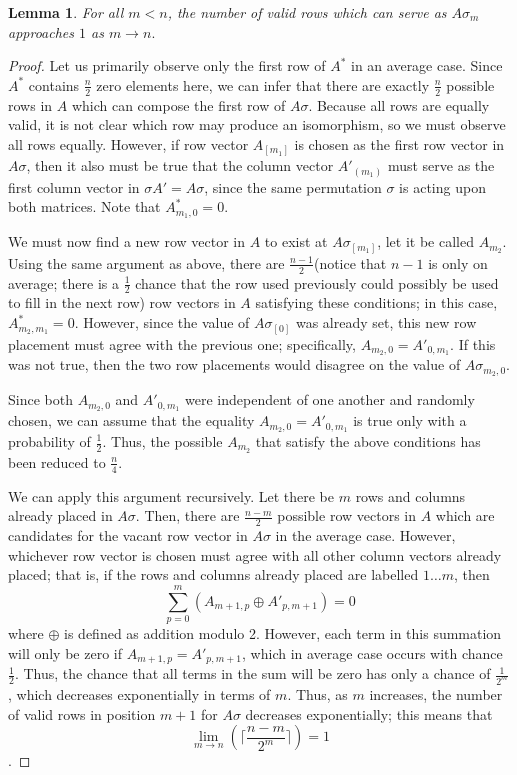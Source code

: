 \documentclass[12pt]{article}
\newtheorem{lemma}[theorem]{Lemma}
\begin{document}
\begin{lemma}
For all $m<n$, the number of valid rows which can serve as $A \sigma_{m}$ approaches $1$ as $m \to n.$
\end{lemma}
\begin{proof}
Let us primarily observe only the first row of $A^*$ in an average case. Since $A^*$ contains $\frac{n}{2}$ zero elements here, we can infer that there are exactly $\frac{n}{2}$ possible rows in $A$ which can compose the first row of $A \sigma$. Because all rows are equally valid, it is not clear which row may produce an isomorphism, so we must observe all rows equally. However, if row vector $A_{[m_1]}$ is chosen as the first row vector in $A \sigma$, then it also must be true that the column vector $A'_{(m_1)}$ must serve as the first column vector in $\sigma A' = A \sigma$, since the same permutation $\sigma$ is acting upon both matrices. Note that $A^*_{m_1, 0} = 0$.

We must now find a new row vector in $A$ to exist at $A \sigma_{[m_1]}$, let it be called $A_{m_2}$. Using the same argument as above, there are $\frac{n-1}{2}$(notice that $n-1$ is only on average; there is a $\frac{1}{2}$ chance that the row used previously could possibly be used to fill in the next row) row vectors in $A$ satisfying these conditions; in this case, $A^*_{m_2,m_1} = 0$. However, since the value of $A \sigma_{[0]}$ was already set, this new row placement must agree with the previous one; specifically, $A_{m_2, 0} = A'_{0, m_1}$. If this was not true, then the two row placements would disagree on the value of $A \sigma_{m_2, 0}$. 

Since both $A_{m_2, 0}$ and $A'_{0, m_1}$ were independent of one another and randomly chosen, we can assume that the equality $A_{m_2, 0} = A'_{0, m_1}$ is true only with a probability of $\frac{1}{2}$. Thus, the possible $A_{m_2}$ that satisfy the above conditions has been reduced to $\frac{n}{4}$.

We can apply this argument recursively. Let there be $m$ rows and columns already placed in $A \sigma$. Then, there are $\frac{n-m}{2}$ possible row vectors in $A$ which are candidates for the vacant row vector in $A \sigma$ in the average case. However, whichever row vector is chosen must agree with all other column vectors already placed; that is, if the rows and columns already placed are labelled $1 \dots m$, then $$\sum_{p=0}^{m} (A_{m+1, p} \oplus A'_{p,m+1}) = 0$$ where $\oplus$ is defined as addition modulo 2. However, each term in this summation will only be zero if $A_{m+1,p} = A'_{p,m+1}$, which in average case occurs with chance $\frac{1}{2}$. Thus, the chance that all terms in the sum will be zero has only a chance of $\frac{1}{2^m}$, which decreases exponentially in terms of $m$. Thus, as $m$ increases, the number of valid rows in position $m+1$ for $A \sigma$ decreases exponentially; this means that $$\lim_{m \to n} (\lceil\frac{n-m}{2^m}\rceil) = 1$$.
\end{proof}
\end{document}
